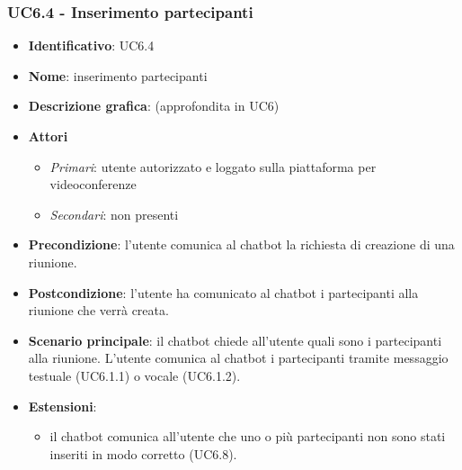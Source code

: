 \subsubsection{UC6.4 - Inserimento partecipanti}
\begin{itemize}
    \item \textbf{Identificativo}: UC6.4
    \item \textbf{Nome}: inserimento partecipanti
    \item \textbf{Descrizione grafica}: (approfondita in UC6)
    \item \textbf{Attori}
 \begin{itemize} 
    \item \textit{Primari}: utente autorizzato e loggato sulla piattaforma per videoconferenze
    \item \textit{Secondari}: non presenti
 \end{itemize}
 \item \textbf{Precondizione}: l'utente comunica al chatbot la richiesta di creazione di una riunione.
 \item \textbf{Postcondizione}: l'utente ha comunicato al chatbot i partecipanti alla riunione che verrà creata.
 \item \textbf{Scenario principale}: il chatbot chiede all'utente quali sono i partecipanti alla riunione. L'utente comunica al chatbot i partecipanti tramite messaggio testuale (UC6.1.1) o vocale (UC6.1.2).
 \item \textbf{Estensioni}: 
 \begin{itemize} 
    \item il chatbot comunica all'utente che uno o più partecipanti non sono stati inseriti in modo corretto (UC6.8).
 \end{itemize}
\end{itemize}

